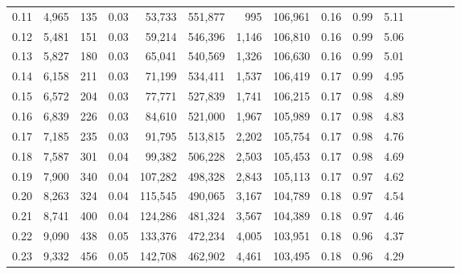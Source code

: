 \begin{tabular}{rrrcrrrrrrrrrrr}
0.11 &   4,965 &    135 &                                       0.03 &   53,733 &  551,877 &      995 &  106,961 &  0.16 &  0.99 &                         5.11 \\
0.12 &   5,481 &    151 &                                       0.03 &   59,214 &  546,396 &    1,146 &  106,810 &  0.16 &  0.99 &                         5.06 \\
0.13 &   5,827 &    180 &                                       0.03 &   65,041 &  540,569 &    1,326 &  106,630 &  0.16 &  0.99 &                         5.01 \\
0.14 &   6,158 &    211 &                                       0.03 &   71,199 &  534,411 &    1,537 &  106,419 &  0.17 &  0.99 &                         4.95 \\
0.15 &   6,572 &    204 &                                       0.03 &   77,771 &  527,839 &    1,741 &  106,215 &  0.17 &  0.98 &                         4.89 \\
0.16 &   6,839 &    226 &                                       0.03 &   84,610 &  521,000 &    1,967 &  105,989 &  0.17 &  0.98 &                         4.83 \\
0.17 &   7,185 &    235 &                                       0.03 &   91,795 &  513,815 &    2,202 &  105,754 &  0.17 &  0.98 &                         4.76 \\
0.18 &   7,587 &    301 &                                       0.04 &   99,382 &  506,228 &    2,503 &  105,453 &  0.17 &  0.98 &                         4.69 \\
0.19 &   7,900 &    340 &                                       0.04 &  107,282 &  498,328 &    2,843 &  105,113 &  0.17 &  0.97 &                         4.62 \\
0.20 &   8,263 &    324 &                                       0.04 &  115,545 &  490,065 &    3,167 &  104,789 &  0.18 &  0.97 &                         4.54 \\
0.21 &   8,741 &    400 &                                       0.04 &  124,286 &  481,324 &    3,567 &  104,389 &  0.18 &  0.97 &                         4.46 \\
0.22 &   9,090 &    438 &                                       0.05 &  133,376 &  472,234 &    4,005 &  103,951 &  0.18 &  0.96 &                         4.37 \\
0.23 &   9,332 &    456 &                                       0.05 &  142,708 &  462,902 &    4,461 &  103,495 &  0.18 &  0.96 &                         4.29 \\

\end{tabular}
